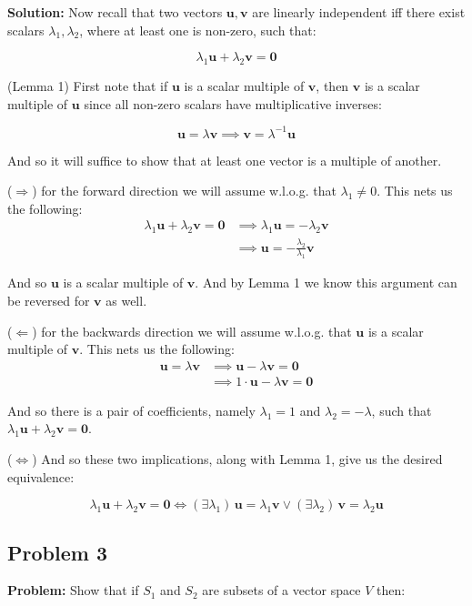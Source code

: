 \documentclass{article}
\renewcommand\vec{\mathbf}
\begin{document}
\noindent\textbf{Solution:} Now recall that two vectors $\vec u,\vec v$ are linearly independent iff there exist scalars $\lambda_1,\lambda_2$, where at least one is non-zero, such that:

$$\lambda_1\vec u+\lambda_2\vec v=\vec 0$$

(Lemma 1) First note that if $\vec u$ is a scalar multiple of $\vec v$, then $\vec v$ is a scalar multiple of $\vec u$ since all non-zero scalars have multiplicative inverses:

$$\vec u=\lambda\vec v\implies \vec v=\lambda^{-1}\vec u$$

And so it will suffice to show that at least one vector is a multiple of another.
\newline

($\Rightarrow$) for the forward direction we will assume w.l.o.g. that $\lambda_1\not=0$. This nets us the following:
\begin{align*}
    \lambda_1\vec u+\lambda_2\vec v=\vec 0&\implies \lambda_1\vec u=-\lambda_2\vec v\\
    &\implies\vec u=-\frac{\lambda_2}{\lambda_1}\vec v
\end{align*}

And so $\vec u$ is a scalar multiple of $\vec v$. And by Lemma 1 we know this argument can be reversed for $\vec v$ as well.
\newline

($\Leftarrow$) for the backwards direction we will assume w.l.o.g. that $\vec u$ is a scalar multiple of $\vec v$. This nets us the following:
\begin{align*}
    \vec u=\lambda\vec v&\implies\vec u-\lambda\vec v=\vec 0\\
    &\implies1\cdot\vec u-\lambda\vec v=\vec 0
\end{align*}

And so there is a pair of coefficients, namely $\lambda_1=1$ and $\lambda_2=-\lambda$, such that $\lambda_1\vec u+\lambda_2\vec v=\vec 0$.
\newline

($\Leftrightarrow$) And so these two implications, along with Lemma 1, give us the desired equivalence:

$$\lambda_1\vec u+\lambda_2\vec v=\vec 0\iff (\exists\lambda_1)\,\vec u=\lambda_1\vec v\vee (\exists\lambda_2)\,\vec v=\lambda_2\vec u$$

\subsection*{Problem 3}
\noindent\textbf{Problem:} Show that if $S_1$ and $S_2$ are subsets of a vector space $V$ then:
\end{document}
